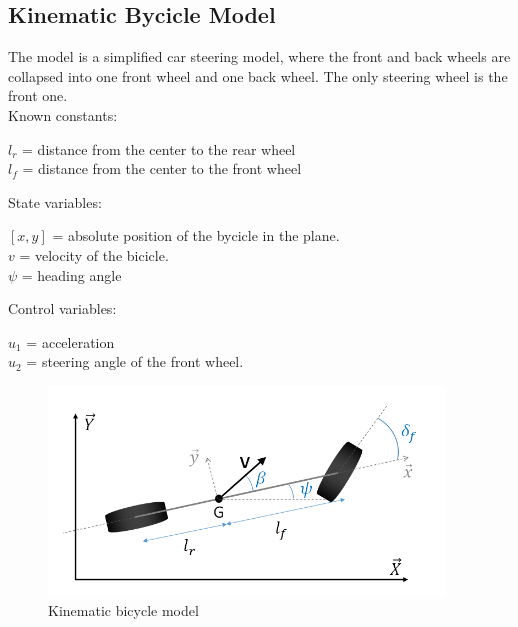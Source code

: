 \documentclass[12pt]{article}
\begin{document}
\subsection{Kinematic Bycicle Model \cite{kbm}}
The model is a simplified car steering model, where the front and back wheels are collapsed into one front wheel and one back wheel. The only steering wheel is the front one. \\
\smallskip
Known constants:
\begin{center}
\( l_r \) = distance from the center to the rear wheel \\
\( l_f \) = distance from the center to the front wheel \\
\end{center}
State variables:
\begin{center}
\( [x, y] \) = absolute position of the bycicle in the plane. \\
\( v \) = velocity of the bicicle. \\
\( \psi \) = heading angle \\
\end{center}
Control variables:
\begin{center}
\( u_1 \) = acceleration \\
\( u_2 \) = steering angle of the front wheel. \\
\end{center}
\begin{figure}[!h]
\includegraphics[width=\textwidth]{bike}
\caption{Kinematic bicycle model}
\end{figure}
\smallskip

\clearpage
\end{document}
